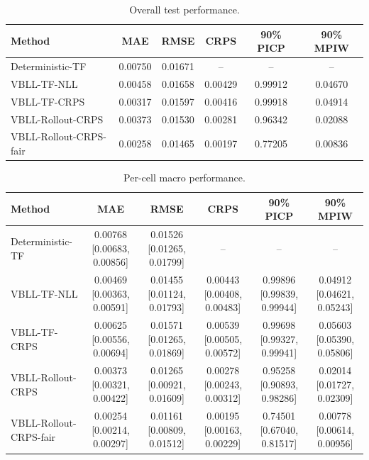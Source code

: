 \documentclass[conference]{IEEEtran}
\begin{document}
\begin{table}[t]
\centering
\scriptsize
\caption{Overall test performance.}
\label{tab:overall}
\setlength{\tabcolsep}{3pt}
\begin{tabular}{@{}lccccc@{}}
\toprule
Method & MAE & RMSE & CRPS & 90\% PICP & 90\% MPIW \\
\midrule
Deterministic-TF & 0.00750 & 0.01671 & -- & -- & -- \\
VBLL-TF-NLL & 0.00458 & 0.01658 & 0.00429 & 0.99912 & 0.04670 \\
VBLL-TF-CRPS & 0.00317 & 0.01597 & 0.00416 & 0.99918 & 0.04914 \\
VBLL-Rollout-CRPS & 0.00373 & 0.01530 & 0.00281 & 0.96342 & 0.02088 \\
VBLL-Rollout-CRPS-fair & 0.00258 & 0.01465 & 0.00197 & 0.77205 & 0.00836 \\
\bottomrule
\end{tabular}
\end{table}

\begin{table}[t]
\centering
\scriptsize
\caption{Per-cell macro performance.}
\label{tab:cell-macro}
\setlength{\tabcolsep}{3pt}
\begin{tabular}{@{}lccccc@{}}
\toprule
Method & MAE & RMSE & CRPS & 90\% PICP & 90\% MPIW \\
\midrule
Deterministic-TF
& 0.00768 [0.00683, 0.00856]
& 0.01526 [0.01265, 0.01799]
& -- & -- & -- \\
VBLL-TF-NLL
& 0.00469 [0.00363, 0.00591]
& 0.01455 [0.01124, 0.01793]
& 0.00443 [0.00408, 0.00483]
& 0.99896 [0.99839, 0.99944]
& 0.04912 [0.04621, 0.05243] \\
VBLL-TF-CRPS
& 0.00625 [0.00556, 0.00694]
& 0.01571 [0.01265, 0.01869]
& 0.00539 [0.00505, 0.00572]
& 0.99698 [0.99327, 0.99941]
& 0.05603 [0.05390, 0.05806] \\
VBLL-Rollout-CRPS
& 0.00373 [0.00321, 0.00422]
& 0.01265 [0.00921, 0.01609]
& 0.00278 [0.00243, 0.00312]
& 0.95258 [0.90893, 0.98286]
& 0.02014 [0.01727, 0.02309] \\
VBLL-Rollout-CRPS-fair
& 0.00254 [0.00214, 0.00297]
& 0.01161 [0.00809, 0.01512]
& 0.00195 [0.00163, 0.00229]
& 0.74501 [0.67040, 0.81517]
& 0.00778 [0.00614, 0.00956] \\
\bottomrule
\end{tabular}
\end{table}
\end{document}
